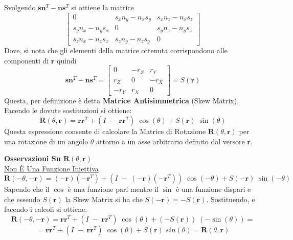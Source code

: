 \documentclass[11pt, a4paper]{report}
\begin{document}
Svolgendo $\mathbf{s}\mathbf{n}^T - \mathbf{n}\mathbf{s}^T$ si ottiene la matrice
\[
    \begin{bmatrix}
        0 & s_{x} n_{y} - n_{x} s_{y} & s_{x} n_{z} - n_{x} s_{z} \\
        s_{y} n_{x} - n_{y} s_{x} & 0 & s_{y} n_{z} - n_{y} s_{z} \\
        s_{z} n_{x} - n_{z} s_{x} & s_{z} n_{y} - n_{z} s_{y} & 0
    \end{bmatrix}
\]
Dove, si nota che gli elementi della matrice ottenuta corrispondono alle componenti di $\mathbf{r}$ quindi
\[
    \mathbf{s}\mathbf{n}^T - \mathbf{n}\mathbf{s}^T =
    \begin{bmatrix}
        0 & -r_{Z} & r_{Y}\\
        r_{Z} & 0 & -r_{X}\\
        -r_{Y} & r_{X} & 0
    \end{bmatrix}
    = S(\mathbf{r})
\]
Questa, per definizione è detta \textbf{Matrice Antisimmetrica} (Skew Matrix). Facendo le dovute sostituzioni si ottiene:
\[
    \boxed{\mathbf{R}(\theta, \mathbf{r}) = \mathbf{r}\mathbf{r}^{T} + (I \; - \; \mathbf{r}\mathbf{r}^{T}) \; \cos(\theta) + S(\mathbf{r}) \; \sin(\theta)}
\]
Questa espressione consente di calcolare la Matrice di Rotazione \(\mathbf{R}(\theta, \mathbf{r})\) per una rotazione di un angolo \(\theta\) attorno a un asse arbitrario definito dal versore \(\mathbf{r}\).

\newpage
\textbf{Osservazioni Su \(\mathbf{R}(\theta, \mathbf{r})\)}\\

\underline{Non È Una Funzione Iniettiva}
\[
    \mathbf{R}(-\theta, -\mathbf{r}) =  (-\mathbf{r})(-\mathbf{r}^{T}) + (I \; - \; (-\mathbf{r})(-\mathbf{r}^{T})) \; \cos(-\theta) + S(\mathbf{-r}) \; \sin(-\theta)
\]
Sapendo che il $\cos$ è una funzione pari mentre il $\sin$ è una funzione dispari e che essendo $S(\mathbf{r})$ la Skew Matrix si ha che $S(\mathbf{-r}) = - S(\mathbf{r})$. Sostituendo, e facendo i calcoli si ottiene:
\[
    \mathbf{R}(-\theta, -\mathbf{r}) =  \mathbf{r}\mathbf{r}^{T} + (I \; - \; \mathbf{r}\mathbf{r}^{T}) \; \cos(\theta) + (-S(\mathbf{r})) \; (-\sin(\theta)) =
\]
\[
    = \mathbf{r}\mathbf{r}^{T} + (I \; - \; \mathbf{r}\mathbf{r}^{T}) \; \cos(\theta) + S(\mathbf{r}) \; sin(\theta) = \mathbf{R}(\theta, \mathbf{r})
\]
\end{document}
